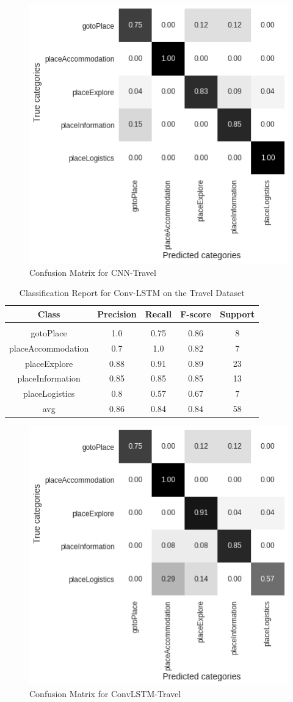 \documentclass[11pt, oneside]{article}   	%
\begin{document}
\begin{figure}[h]
\centering
\includegraphics[width=0.6\linewidth]{CNN-Travel}
\caption{Confusion Matrix for CNN-Travel }
\label{fig:CNN-Travel}
\end{figure}

\newpage
\begin{table}[h]
\centering
\caption{Classification Report for Conv-LSTM on the Travel Dataset}
\begin{tabular}{c | c c c c}
Class & Precision & Recall & F-score & Support\\
\hline
\hline\\
gotoPlace & 1.0 & 0.75 & 0.86 & 8\\
placeAccommodation & 0.7 & 1.0 & 0.82 & 7\\
placeExplore & 0.88 & 0.91 & 0.89 & 23\\
placeInformation & 0.85 & 0.85 & 0.85 & 13\\
placeLogistics & 0.8 & 0.57 & 0.67 & 7\\
avg & 0.86 & 0.84 & 0.84 & 58\\
\end{tabular}
\end{table}

\begin{figure}[h]
\centering
\includegraphics[width=0.6\linewidth]{ConvLSTM-Travel}
\caption{Confusion Matrix for ConvLSTM-Travel }
\label{fig:ConvLSTM-Travel}
\end{figure}
\end{document}
